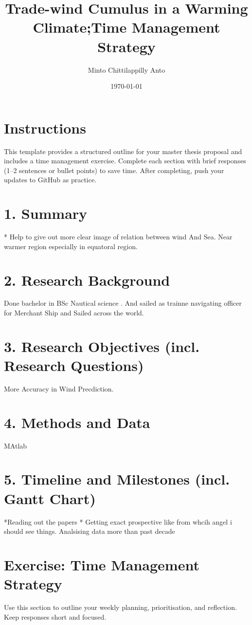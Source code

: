 \documentclass[a4paper,12pt]{article}
\title{Trade-wind Cumulus in a Warming Climate;Time Management Strategy}
\author{Minto Chittilappilly Anto}
\date{\today}
\begin{document}
\maketitle

\section*{Instructions}
This template provides a structured outline for your master thesis proposal and includes a time management exercise. Complete each section with brief responses (1–2 sentences or bullet points) to save time. After completing, push your updates to GitHub as practice.

\section{1. Summary}
* Help to give out more clear image of relation between wind   And Sea. Near warmer region especially in equatoral region.\\

\section{2. Research Background}
Done bachelor in BSc Nautical science . And sailed as trainne navigating officer for Merchant Ship and Sailed across the world.\\

\section{3. Research Objectives (incl. Research Questions)}
More Accuracy  in Wind Precdiction.

\section{4. Methods and Data}
MAtlab\\

\section{5. Timeline and Milestones (incl. Gantt Chart)}
*Reading out the papers
* Getting exact prospective like from whcih angel i should see things.
 Analsising data  more than past decade
\\

\section{Exercise: Time Management Strategy}
Use this section to outline your weekly planning, prioritisation, and reflection. Keep responses short and focused.
\end{document}
